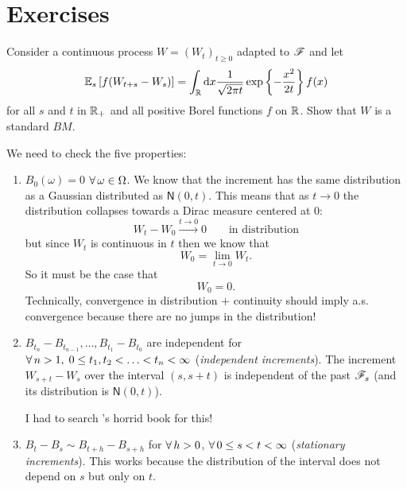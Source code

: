 \documentclass[12pt]{report}
\begin{document}
\section*{Exercises}
\label{sec:exer1}
\begin{exercise}
	Consider a continuous process $W={(W_{t})}_{t\geq0}$ adapted to $\mathscr{F}$ and let 
	\begin{equation*}
		\mathbb{E}_{s}\left[f(W_{t+s}-W_{s})\right]=\int_{\mathbb{R}}\mathop{}\!\mathrm{d} x\frac{1}{\sqrt{2\pi t}}\exp\left\{-\frac{x^{2}}{2t}\right\}f(x)
	\end{equation*}
	for all $s$ and $t$ in $\mathbb{R}_{+}$ and all positive Borel functions $f$ on $\mathbb{R}$. Show that $W$ is a standard $BM$.
\end{exercise}
	We need to check the five properties:
\begin{enumerate}
	\item $B_{0}(\omega)=0$ \as{} $\forall\,\omega\in\Omega$. We know that the increment has the same distribution as a Gaussian \rv{} distributed as $\mathsf{N}(0,t)$. This means that as $t\to0$ the distribution collapses towards a Dirac measure centered at 0:
	\begin{equation*}
		W_{t}-W_{0}\xrightarrow{t\to0}0\qquad\text{in distribution}
	\end{equation*}
	but since $W_{t}$ is continuous in $t$ then we know that 
	\begin{equation*}
		W_{0}=\lim_{t\to0}W_{t}.
	\end{equation*}
	So it must be the case that 
	\begin{equation*}
		W_{0}=0.
	\end{equation*}
	Technically, convergence in distribution + continuity should imply a.s. convergence because there are no jumps in the distribution!\hspace*{\fill}\faCheckCircle
	\item $B_{t_{n}}-B_{t_{n-1}},\ldots,B_{t_{1}}-B_{t_{0}}$ are independent for $\forall\, n>1,\;0\leq t_{1},t_{2}<\ldots<t_{n}<\infty$ (\emph{independent increments}). The increment $W_{s+t}-W_{s}$ over the interval $(s,s+t)$ is independent of the past $\mathscr{F}_{s}$ (and its distribution is $\mathsf{N}(0,t)$).\hspace*{\fill}\faCheckCircle
	\begin{insult}
		I had to search \cinlar's horrid book for this!
	\end{insult}
	\item $B_{t}-B_{s}\sim B_{t+h}-B_{s+h}$ for $\forall\, h>0$, $\forall\, 0\leq s<t<\infty$ (\emph{stationary increments}). This works because the distribution of the interval does not depend on $s$ but only on $t$.\hspace*{\fill}\faCheckCircle

\end{enumerate}
\end{document}
